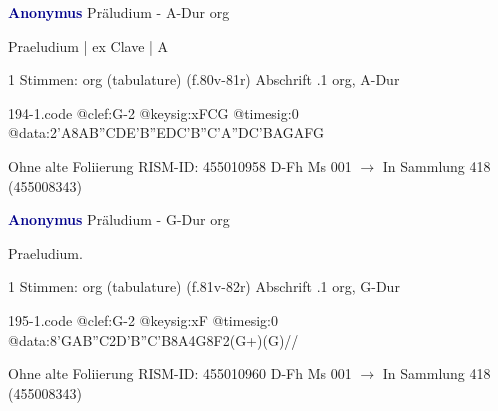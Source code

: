 \documentclass[twocolumn]{book}
\begin{document}
\newline \par \vspace{7pt} \textcolor{darkblue}{\textbf{Anonymus  }}
\newline Präludium - A-Dur
\newline org
\newline \begin{itshape}[f.81r, at left:] Praeludium | ex Clave | A\end{itshape} 
\newline \textcolor{darkblue}{}  1 Stimmen: org (tabulature)  (f.80v-81r)
\newline Abschrift
.1  org, A-Dur  
\begin{filecontents*}{194-1.code}
@clef:G-2
@keysig:xFCG
@timesig:0
@data:2'A{8AB''CD}{E'B''ED}{C'B''C'A}{''DC'BA}{GAFG}
\end{filecontents*}
\newline
%
\newline Ohne alte Foliierung
\newline RISM-ID: 455010958
\newline D-Fh  Ms 001
\newline $\rightarrow$ In Sammlung 418 (455008343)
      
\newline \par \vspace{7pt} \textcolor{darkblue}{\textbf{Anonymus  }}
\newline Präludium - G-Dur
\newline org
\newline \begin{itshape}[f.81v, at left:] Praeludium.\end{itshape} 
\newline \textcolor{darkblue}{}  1 Stimmen: org (tabulature)  (f.81v-82r)
\newline Abschrift
.1  org, G-Dur  
\begin{filecontents*}{195-1.code}
@clef:G-2
@keysig:xF
@timesig:0
@data:{8'GAB''C}2D'B''C'B8A4G8F2(G+)(G)//
\end{filecontents*}
\newline
%
\newline Ohne alte Foliierung
\newline RISM-ID: 455010960
\newline D-Fh  Ms 001
\newline $\rightarrow$ In Sammlung 418 (455008343)
      
\end{document}
